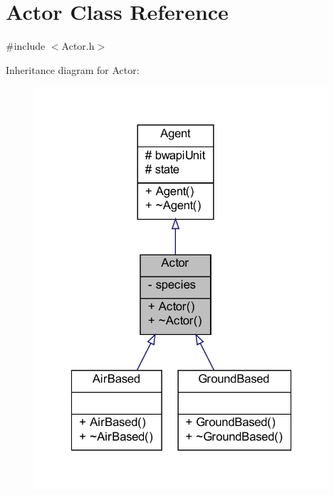 \hypertarget{classActor}{\section{Actor Class Reference}
\label{classActor}
}


{\ttfamily \#include $<$Actor.\-h$>$}



Inheritance diagram for Actor\-:
\nopagebreak
\begin{figure}[H]
\begin{center}
\leavevmode
\includegraphics[width=310pt]{classActor__inherit__graph}
\end{center}
\end{figure}


